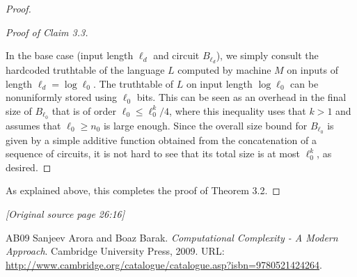 \documentclass[11pt]{article}
\newcommand{\sourcepage}[1]{\par\Needspace{5\baselineskip}\bigskip\noindent\textit{[Original source page 26:#1]}\par\medskip}
\begin{document}
\begin{proof}
\begin{proof}[Proof of Claim 3.3]
\begin{itemize}[label=--]
\end{itemize}
In the base case (input length $\ell_d$ and circuit $B_{\ell_d}$), we simply consult the hardcoded truthtable of the language $L$ computed by machine $M$ on inputs of length $\ell_d=\log\ell_0$. The truthtable of $L$ on input length $\log\ell_0$ can be nonuniformly stored using $\ell_0$ bits. This can be seen as an overhead in the final size of $B_{\ell_0}$ that is of order $\ell_0\le\ell_0^k/4$, where this inequality uses that $k>1$ and assumes that $\ell_0\ge n_0$ is large enough. Since the overall size bound for $B_{\ell_0}$ is given by a simple additive function obtained from the concatenation of a sequence of circuits, it is not hard to see that its total size is at most $\ell_0^k$, as desired.
\end{proof}
As explained above, this completes the proof of Theorem 3.2.
\end{proof}

\sourcepage{16}
\begin{thebibliography}{AB09}
 Sanjeev Arora and Boaz Barak. \emph{Computational Complexity - A Modern Approach}. Cambridge University Press, 2009. URL: \url{http://www.cambridge.org/catalogue/catalogue.asp?isbn=9780521424264}.
\end{thebibliography}
\end{document}
